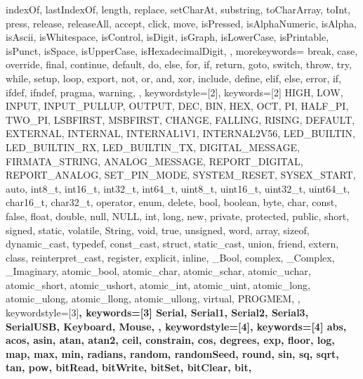 {{      indexOf, lastIndexOf, length, replace, setCharAt, substring, 
      toCharArray, toInt, press, release, releaseAll, accept, click, move, 
      isPressed, isAlphaNumeric, isAlpha, isAscii, isWhitespace, isControl, 
      isDigit, isGraph, isLowerCase, isPrintable, isPunct, isSpace, 
      isUpperCase, isHexadecimalDigit, 
    }, 
  morekeywords={   %
      break, case, override, final, continue, default, do, else, for, 
      if, return, goto, switch, throw, try, while, setup, loop, export, 
      not, or, and, xor, include, define, elif, else, error, if, ifdef, 
      ifndef, pragma, warning,
    }, 
  keywordstyle=[2]\color{arduinoBlue},   
  keywords=[2]{   %
      HIGH, LOW, INPUT, INPUT_PULLUP, OUTPUT, DEC, BIN, HEX, OCT, PI, 
      HALF_PI, TWO_PI, LSBFIRST, MSBFIRST, CHANGE, FALLING, RISING, 
      DEFAULT, EXTERNAL, INTERNAL, INTERNAL1V1, INTERNAL2V56, LED_BUILTIN, 
      LED_BUILTIN_RX, LED_BUILTIN_TX, DIGITAL_MESSAGE, FIRMATA_STRING, 
      ANALOG_MESSAGE, REPORT_DIGITAL, REPORT_ANALOG, SET_PIN_MODE, 
      SYSTEM_RESET, SYSEX_START, auto, int8_t, int16_t, int32_t, int64_t, 
      uint8_t, uint16_t, uint32_t, uint64_t, char16_t, char32_t, operator, 
      enum, delete, bool, boolean, byte, char, const, false, float, double, 
      null, NULL, int, long, new, private, protected, public, short, 
      signed, static, volatile, String, void, true, unsigned, word, array, 
      sizeof, dynamic_cast, typedef, const_cast, struct, static_cast, union, 
      friend, extern, class, reinterpret_cast, register, explicit, inline, 
      _Bool, complex, _Complex, _Imaginary, atomic_bool, atomic_char, 
      atomic_schar, atomic_uchar, atomic_short, atomic_ushort, atomic_int, 
      atomic_uint, atomic_long, atomic_ulong, atomic_llong, atomic_ullong, 
      virtual, PROGMEM,
    },  
  keywordstyle=[3]\bfseries\color{arduinoOrange},
  keywords=[3]{  %
      Serial, Serial1, Serial2, Serial3, SerialUSB, Keyboard, Mouse,
    },      
  keywordstyle=[4]\color{arduinoOrange},
  keywords=[4]{  %
      abs, acos, asin, atan, atan2, ceil, constrain, cos, degrees, exp, 
      floor, log, map, max, min, radians, random, randomSeed, round, sin, 
      sq, sqrt, tan, pow, bitRead, bitWrite, bitSet, bitClear, bit, 
}}
